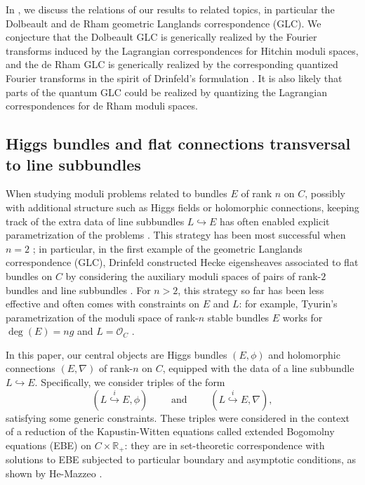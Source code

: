 \documentclass[twoside, 11pt]{article}
\numberwithin{equation}{section}
\theoremstyle{theorem}
\numberwithin{theorem}{section}
\theoremstyle{definition}
\begin{document}
In , we discuss the relations of our results to related topics, in particular the Dolbeault and de Rham geometric Langlands correspondence (GLC). We conjecture that the Dolbeault GLC is generically realized by the Fourier transforms induced by the Lagrangian correspondences for Hitchin moduli spaces, and the de Rham GLC is generically realized by the corresponding quantized Fourier transforms in the spirit of Drinfeld's formulation \cite{Drinfeld}. 
It is also likely that parts of the quantum GLC could be realized by quantizing the Lagrangian correspondences for de Rham moduli spaces. 


\subsection{Higgs bundles and flat connections transversal to line subbundles}
\label{sect-triples}
When studying moduli problems related to bundles $E$ of rank $n$ on $C$, possibly with additional structure such as Higgs fields or holomorphic connections, keeping track of the extra data of line subbundles $L \hookrightarrow E$ has often enabled explicit parametrization of the problems \cite{Tyurin1967, yoshi97, EnriquezRubtsov2007}. 
This strategy has been most successful when $n = 2$ \cite{LN83, Hit87a};
in particular, in the first example of the geometric Langlands correspondence (GLC), Drinfeld constructed Hecke eigensheaves associated to flat bundles on $C$ by considering the auxiliary moduli spaces of pairs of rank-$2$ bundles and line subbundles \cite{Drinfeld}.
For $n > 2$, this strategy so far has been less effective and often comes with constraints on $E$ and $L$:
for example, Tyurin's parametrization of the moduli space of rank-$n$ stable bundles $E$ works for $\deg(E) = ng$ and $L = \mathcal{O}_C$ \cite{Tyurin1967}.

In this paper, our central objects are Higgs bundles $(E, \phi)$ and holomorphic connections $(E, \nabla)$ of rank-$n$ on $C$, equipped with the data of a line subbundle $L \hookrightarrow E$. 
Specifically, we consider triples of the form 
\begin{equation}\label{intro-triples}
(L \overset{i}{\hookrightarrow} E, \phi) \qquad  \text{ and } \qquad 
(L \overset{i}{\hookrightarrow} E, \nabla),
\end{equation}
satisfying some generic constraints.
These triples were considered in the context of a reduction of the Kapustin-Witten equations called extended Bogomolny equations (EBE) on $C \times \mathbb{R}_+$: they are in set-theoretic correspondence with solutions to EBE subjected to particular boundary and asymptotic conditions, as shown by He-Mazzeo \cite{HM20}. 
\end{document}
